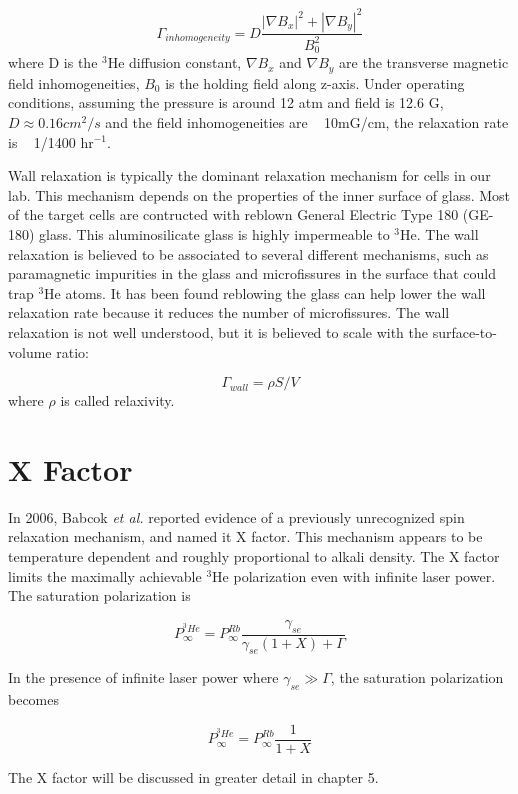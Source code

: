\begin{equation}
\Gamma_{inhomogeneity} = D\frac{|\nabla B_{x}|^{2}+|\nabla B_{y}|^{2}}{B_{0}^{2}}
\end{equation}
where D is the $^{3}$He diffusion constant, $\nabla B_{x}$ and $\nabla B_{y}$ are the transverse magnetic field inhomogeneities, $B_{0}$ is the holding field along z-axis. Under operating conditions, assuming the pressure is around 12 atm and field is 12.6 G, $D\approx 0.16cm^{2}/s$ and the field inhomogeneities are ~ 10mG/cm, the relaxation rate is ~ 1/1400 hr$^{-1}$.

Wall relaxation is typically the dominant relaxation mechanism for cells in our lab. This mechanism depends on the properties of the inner surface of glass. Most of the target cells are contructed with reblown General Electric Type 180 (GE-180) glass. This aluminosilicate glass is highly impermeable to $^{3}$He. The wall relaxation is believed to be associated to several different mechanisms, such as paramagnetic impurities in the glass and microfissures in the surface that could trap $^{3}$He atoms. It has been found reblowing the glass can help lower the wall relaxation rate because it reduces the number of microfissures. The wall relaxation is not well understood, but it is believed to scale with the surface-to-volume ratio:

\begin{equation}
\Gamma_{wall} = \rho S/V
\end{equation}
where $\rho$ is called relaxivity.

\section{X Factor}

In 2006, Babcok \emph{et al.} reported evidence of a previously unrecognized spin relaxation mechanism, and named it X factor. This mechanism appears to be temperature dependent and roughly proportional to alkali density. The X factor limits the maximally achievable $^{3}$He polarization even with infinite laser power. The saturation polarization is 

\begin{equation}
P_{\infty}^{^{3}He}=P_{\infty}^{Rb}\frac{\gamma_{se}}{\gamma_{se}(1+X)+\Gamma}
\end{equation}

In the presence of infinite laser power where $\gamma_{se} \gg \Gamma$, the saturation polarization becomes

\begin{equation}
P_{\infty}^{^{3}He}=P_{\infty}^{Rb}\frac{1}{1+X}
\end{equation}

The X factor will be discussed in greater detail in chapter 5.



















